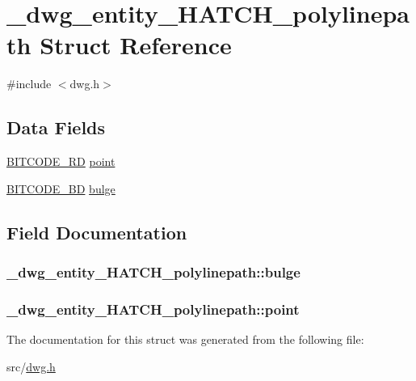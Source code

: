 \hypertarget{struct__dwg__entity__HATCH__polylinepath}{\section{\-\_\-dwg\-\_\-entity\-\_\-\-H\-A\-T\-C\-H\-\_\-polylinepath \-Struct \-Reference}
\label{struct__dwg__entity__HATCH__polylinepath}
}


{\ttfamily \#include $<$dwg.\-h$>$}

\subsection*{\-Data \-Fields}
\begin{DoxyCompactItemize}
\item 
\hyperlink{dwg_8h_a1d23a9bc9a02453876b244dc6706f6a6}{\-B\-I\-T\-C\-O\-D\-E\-\_\-R\-D} \hyperlink{struct__dwg__entity__HATCH__polylinepath_a8e4414f78e1a836b961f915da26e55c7}{point}
\item 
\hyperlink{dwg_8h_a3c1e6781466b74ba07785d57da70ed97}{\-B\-I\-T\-C\-O\-D\-E\-\_\-\-B\-D} \hyperlink{struct__dwg__entity__HATCH__polylinepath_aff81e2e01e80ae3dba28aad2a0c66246}{bulge}
\end{DoxyCompactItemize}


\subsection{\-Field \-Documentation}
\hypertarget{struct__dwg__entity__HATCH__polylinepath_aff81e2e01e80ae3dba28aad2a0c66246}{
\subsubsection[{bulge}]{ {\bf \-\_\-dwg\-\_\-entity\-\_\-\-H\-A\-T\-C\-H\-\_\-polylinepath\-::bulge}}}\label{struct__dwg__entity__HATCH__polylinepath_aff81e2e01e80ae3dba28aad2a0c66246}
\hypertarget{struct__dwg__entity__HATCH__polylinepath_a8e4414f78e1a836b961f915da26e55c7}{
\subsubsection[{point}]{ {\bf \-\_\-dwg\-\_\-entity\-\_\-\-H\-A\-T\-C\-H\-\_\-polylinepath\-::point}}}\label{struct__dwg__entity__HATCH__polylinepath_a8e4414f78e1a836b961f915da26e55c7}


\-The documentation for this struct was generated from the following file\-:\begin{DoxyCompactItemize}
\item 
src/\hyperlink{dwg_8h}{dwg.\-h}\end{DoxyCompactItemize}
